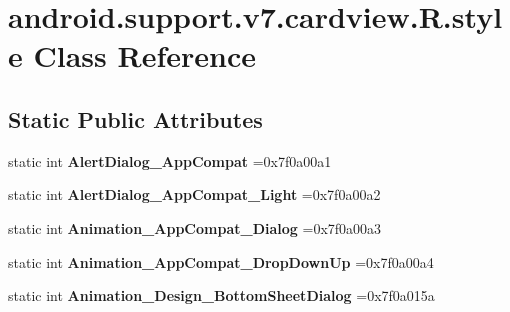 \hypertarget{classandroid_1_1support_1_1v7_1_1cardview_1_1R_1_1style}{}\section{android.\+support.\+v7.\+cardview.\+R.\+style Class Reference}
\label{classandroid_1_1support_1_1v7_1_1cardview_1_1R_1_1style}
\subsection*{Static Public Attributes}
\begin{DoxyCompactItemize}
\item 
\mbox{\label{classandroid_1_1support_1_1v7_1_1cardview_1_1R_1_1style_a2ac64f688c7b65644c25a08a1747719d}} 
static int {\bfseries Alert\+Dialog\+\_\+\+App\+Compat} =0x7f0a00a1
\item 
\mbox{\label{classandroid_1_1support_1_1v7_1_1cardview_1_1R_1_1style_a939d07ba8673fb13414b207e9bafc32d}} 
static int {\bfseries Alert\+Dialog\+\_\+\+App\+Compat\+\_\+\+Light} =0x7f0a00a2
\item 
\mbox{\label{classandroid_1_1support_1_1v7_1_1cardview_1_1R_1_1style_adaef0d7fe84d32b5643d71932a0ca02e}} 
static int {\bfseries Animation\+\_\+\+App\+Compat\+\_\+\+Dialog} =0x7f0a00a3
\item 
\mbox{\label{classandroid_1_1support_1_1v7_1_1cardview_1_1R_1_1style_a64066d792c2135f4d8ae1e7be085d61b}} 
static int {\bfseries Animation\+\_\+\+App\+Compat\+\_\+\+Drop\+Down\+Up} =0x7f0a00a4
\item 
\mbox{\label{classandroid_1_1support_1_1v7_1_1cardview_1_1R_1_1style_a2ceb5004f34aef92a7b4d003bca130e6}} 
static int {\bfseries Animation\+\_\+\+Design\+\_\+\+Bottom\+Sheet\+Dialog} =0x7f0a015a
\item 
\mbox{\label{classandroid_1_1support_1_1v7_1_1cardview_1_1R_1_1style_abb4ea2ca45b53816f992dcb518f3b120}} 

\end{DoxyCompactItemize}
